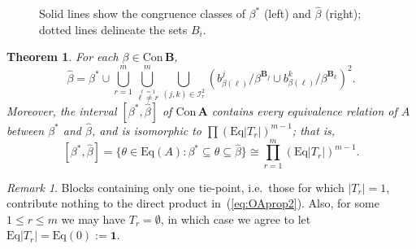 \documentclass[cm,dissertation,actual,final]{uhthesis}
\theoremstyle{plain}
\newtheorem{theorem}{Theorem}[section]
\theoremstyle{definition}
\theoremstyle{remark}
\newtheorem*{remark}{Remark}
\numberwithin{theorem}{section}
\numberwithin{claim}{chapter}
\numberwithin{equation}{section}
\numberwithin{conjecture}{chapter}
\newcommand{\<}{\ensuremath{\langle}}
\renewcommand{\>}{\ensuremath{\rangle}}
\renewcommand{\leq}{\ensuremath{\leqslant}}
\newcommand{\Eq}{\ensuremath{\mathrm{Eq}}}
\newcommand{\Con}{\ensuremath{\mathrm{Con\,}}}
\newcommand{\0}{\ensuremath{\mathbf{0}}}
\newcommand{\1}{\ensuremath{\mathbf{1}}}
\newcommand{\2}{\ensuremath{\mathbf{2}}}
\newcommand{\3}{\ensuremath{\mathbf{3}}}
\newcommand{\4}{\ensuremath{\mathbf{4}}}
\newcommand{\5}{\ensuremath{\mathbf{5}}}
\newcommand{\bA}{\ensuremath{\mathbf{A}}}
\newcommand{\bB}{\ensuremath{\mathbf{B}}}
\newcommand{\sI}{\ensuremath{\mathscr{I}}}
\newcommand{\one}{\ensuremath{\mathbf{1}}}
\newcommand{\hbeta}{\ensuremath{\widehat{\beta}}}
\begin{document}
\begin{figure}[h!]
{
      }
      \caption{Solid lines show the congruence classes of $\beta^*$ (left) and 
        $\hbeta$ (right); dotted lines delineate the sets $B_i$.}
      \label{fig:overalgebra1}
\end{figure}

\begin{theorem} 
  \label{OAthm2}
  For each $\beta \in \Con \bB$, 
  \begin{equation}
    \label{eq:OAbetahat}
    \widehat{\beta} = 
    \beta^* \cup 
    \bigcup_{r=1}^m
    \bigcup^m_{\stackrel{\ell=1}{\ell \neq r}}
    \bigcup_{(j,k) \in \sI_r^2}
    \left(b^j_{\beta(\ell)}/\beta^{\bB_j} \cup b^k_{\beta(\ell)}/\beta^{\bB_k}\right)^2.
  \end{equation}
  Moreover, the interval $[\beta^*, \widehat{\beta}]$ of $\Con\bA$ 
  contains every equivalence relation of $A$ between $\beta^*$ and $\hbeta$, and
  is isomorphic to $\prod (\Eq |T_r|)^{m-1}$; that is,
  \begin{equation}
    \label{eq:OAprop2}
          [\beta^*, \widehat{\beta}] 
          = 
          \{\theta \in \Eq(A) : \beta^* \subseteq \theta \subseteq \widehat{\beta} \}
          \cong \prod_{r=1}^m (\Eq |T_r|)^{m-1}.
  \end{equation}
\end{theorem}
\begin{remark}
  Blocks containing only one tie-point, i.e.~those for which $|T_r| = 1$,
  contribute nothing to the direct product in~(\ref{eq:OAprop2}). Also, for some
  $1\leq r \leq m$ we may have $T_r = \emptyset$, in which case we agree 
  to let $\Eq |T_r| = \Eq (0) := \one$.
\end{remark}
\end{document}
